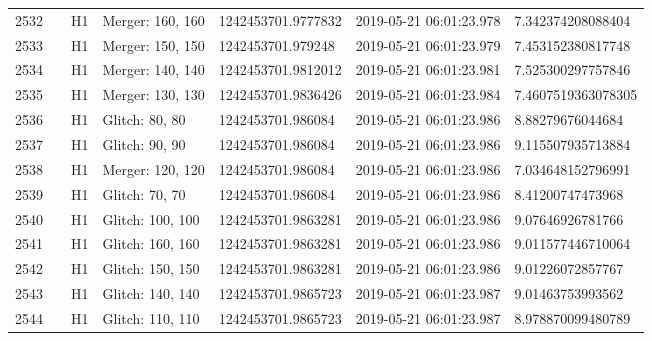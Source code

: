 \begin{longtable}{lllllll}
2532 &                                                    &       H1 &  Merger: 160, 160 &  1242453701.9777832 &  2019-05-21 06:01:23.978 &   7.342374208088404 \\
2533 &                                                    &       H1 &  Merger: 150, 150 &   1242453701.979248 &  2019-05-21 06:01:23.979 &   7.453152380817748 \\
2534 &                                                    &       H1 &  Merger: 140, 140 &  1242453701.9812012 &  2019-05-21 06:01:23.981 &   7.525300297757846 \\
2535 &                                                    &       H1 &  Merger: 130, 130 &  1242453701.9836426 &  2019-05-21 06:01:23.984 &  7.4607519363078305 \\
2536 &                                                    &       H1 &    Glitch: 80, 80 &   1242453701.986084 &  2019-05-21 06:01:23.986 &    8.88279676044684 \\
2537 &                                                    &       H1 &    Glitch: 90, 90 &   1242453701.986084 &  2019-05-21 06:01:23.986 &   9.115507935713884 \\
2538 &                                                    &       H1 &  Merger: 120, 120 &   1242453701.986084 &  2019-05-21 06:01:23.986 &   7.034648152796991 \\
2539 &                                                    &       H1 &    Glitch: 70, 70 &   1242453701.986084 &  2019-05-21 06:01:23.986 &    8.41200747473968 \\
2540 &                                                    &       H1 &  Glitch: 100, 100 &  1242453701.9863281 &  2019-05-21 06:01:23.986 &    9.07646926781766 \\
2541 &                                                    &       H1 &  Glitch: 160, 160 &  1242453701.9863281 &  2019-05-21 06:01:23.986 &   9.011577446710064 \\
2542 &                                                    &       H1 &  Glitch: 150, 150 &  1242453701.9863281 &  2019-05-21 06:01:23.986 &    9.01226072857767 \\
2543 &                                                    &       H1 &  Glitch: 140, 140 &  1242453701.9865723 &  2019-05-21 06:01:23.987 &    9.01463753993562 \\
2544 &                                                    &       H1 &  Glitch: 110, 110 &  1242453701.9865723 &  2019-05-21 06:01:23.987 &   8.978870099480789 \\

\end{longtable}
